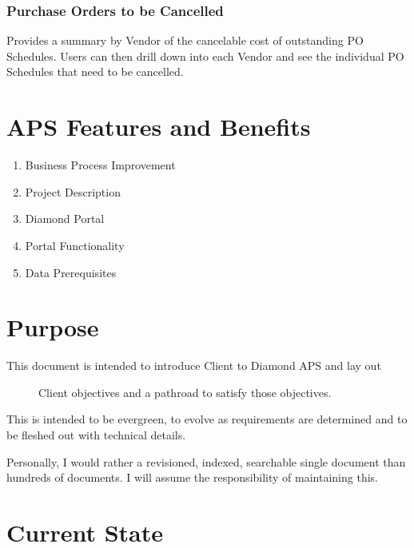 \documentclass[letterpaper,10pt,english]{sphinxmanual}
\begin{document}
\subsection{Purchase Orders to be Cancelled}
\label{APS/Introduction:purchase-orders-to-be-cancelled}
Provides a summary by Vendor of the cancelable cost of outstanding PO
Schedules. Users can then drill down into each Vendor and see the
individual PO Schedules that need to be cancelled.


\chapter{APS Features and Benefits}
\label{APS/APS-Features-and-Benefits::doc}\label{APS/APS-Features-and-Benefits:aps-features-and-benefits}\begin{enumerate}
\item {} 
Business Process Improvement

\item {} 
Project Description

\item {} 
Diamond Portal

\item {} 
Portal Functionality

\item {} 
Data Prerequisites

\end{enumerate}


\chapter{Purpose}
\label{APS/APS-Features-and-Benefits:purpose}\begin{description}
\item[{This document is intended to introduce Client to Diamond APS and lay out}] \leavevmode
Client objectives and a pathroad to satisfy those objectives.

\end{description}

This is intended to be evergreen, to evolve as requirements are
determined and to be fleshed out with technical details.

Personally, I would rather a revisioned, indexed, searchable single
document than hundreds of documents. I will assume the responsibility of maintaining this.


\chapter{Current State}
\label{APS/APS-Features-and-Benefits:current-state}
\end{document}
